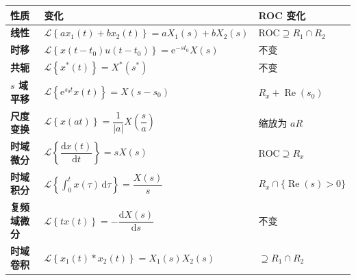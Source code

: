 \documentclass[UTF8,fontset=fandol,zihao=5]{ctexart}
\newcommand{\LL}{\mathcal{L}}
\begin{document}
\begin{table}[H]
  \centering
  \begin{tabularx}{\textwidth}{
    >{\bfseries}p{2cm}
    >{\centering\arraybackslash}X
    >{\centering\arraybackslash}p{3.2cm}
  }
    \toprule
    性质 & 变化 & ROC 变化 \\
    \midrule
    线性
    & $\LL\left\{a x_1(t)+b x_2(t)\right\}=aX_1(s)+bX_2(s)$
    & $\text{ROC} \supseteq R_1\cap R_2$ \\

    时移
    & $\LL\left\{x(t-t_0)u(t-t_0)\right\}=\mathrm{e}^{-st_0}X(s)$
    & 不变 \\

    共轭
    & $\LL\left\{x^*(t)\right\}=X^*(s^*)$
    & 不变 \\

    $s$ 域平移
    & $\LL\left\{\mathrm{e}^{s_0t}x(t)\right\}=X(s-s_0)$
    & $R_x+\operatorname{Re}(s_0)$ \\

    尺度变换
    & $\LL\left\{x(at)\right\}=\dfrac{1}{|a|}X\left(\dfrac{s}{a}\right)$
    & 缩放为 $aR$ \\

    时域微分
    & $\LL\left\{\dfrac{\mathrm{d}x(t)}{\mathrm{d}t}\right\}=sX(s)$
    & $\text{ROC} \supseteq R_x$ \\

    时域积分
    & $\LL\left\{\displaystyle\int_0^t x(\tau)\,\mathrm{d}\tau\right\}=\dfrac{X(s)}{s}$
    & $R_x\cap\{\operatorname{Re}(s)>0\}$ \\

    复频域微分
    & $\LL\left\{t x(t)\right\}=-\dfrac{\mathrm{d}X(s)}{\mathrm{d}s}$
    & 不变 \\

    时域卷积
    & $\LL\left\{x_1(t)*x_2(t)\right\}=X_1(s)X_2(s)$
    & $\supseteq R_1\cap R_2$ \\
    \bottomrule
  \end{tabularx}
\end{table}
\end{document}
